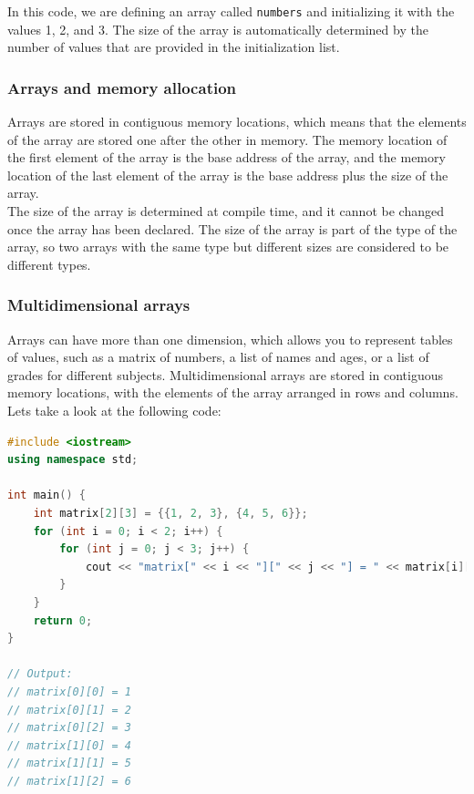 In this code, we are defining an array called \texttt{numbers} and initializing it with the values 1, 2, and 3. The size of
the array is automatically determined by the number of values that are provided in the initialization list.\\

\subsubsection{Arrays and memory allocation}

Arrays are stored in contiguous memory locations, which means that the elements of the array are stored one after the other
in memory. The memory location of the first element of the array is the base address of the array, and the memory location of
the last element of the array is the base address plus the size of the array.\\

The size of the array is determined at compile time, and it cannot be changed once the array has been declared. The size of
the array is part of the type of the array, so two arrays with the same type but different sizes are considered to be different
types.\\

\subsubsection{Multidimensional arrays}

Arrays can have more than one dimension, which allows you to represent tables of values, such as a matrix of numbers, a list of
names and ages, or a list of grades for different subjects. Multidimensional arrays are stored in contiguous memory locations,
with the elements of the array arranged in rows and columns.\\

Lets take a look at the following code:

\begin{lstlisting}[language=C++]
#include <iostream>
using namespace std;

int main() {
    int matrix[2][3] = {{1, 2, 3}, {4, 5, 6}};
    for (int i = 0; i < 2; i++) {
        for (int j = 0; j < 3; j++) {
            cout << "matrix[" << i << "][" << j << "] = " << matrix[i][j] << endl;
        }
    }
    return 0;
}

// Output:
// matrix[0][0] = 1
// matrix[0][1] = 2
// matrix[0][2] = 3
// matrix[1][0] = 4
// matrix[1][1] = 5
// matrix[1][2] = 6
\end{lstlisting}

